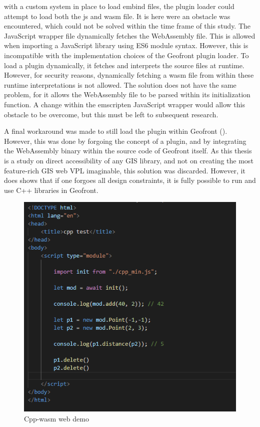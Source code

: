 with a custom system in place to load embind files, the plugin loader could attempt to load both the js and wasm file. 
It is here were an obstacle was encountered, which could not be solved within the time frame of this study. 
The JavaScript wrapper file dynamically fetches the WebAssembly file. 
This is allowed when importing a JavaScript library using ES6 module syntax. 
However, this is incompatible with the implementation choices of the Geofront plugin loader. 
To load a plugin dynamically, it fetches and interprets the source files at runtime. 
However, for security reasons, dynamically fetching a wasm file from within these runtime interpretations is not allowed.
The  solution does not have the same problem, for it allows the WebAssembly file to be parsed within its initialization function.
A change within the emscripten JavaScript wrapper would allow this obstacle to be overcome, but this must be left to subsequent research. 

A final workaround was made to still load the plugin within Geofront (). 
However, this was done by forgoing the concept of a plugin, and by integrating the WebAssembly binary within the source code of Geofront itself.
As this thesis is a study on direct accessibility of any \ac{GIS} library, and not on creating the most feature-rich \ac{GIS} web \ac{VPL} imaginable, this solution was discarded.    
However, it does shows that if one forgoes all design constraints, it is fully possible to run and use C++ libraries in Geofront. 

\begin{figure}
  \graphicspath{{../../assets/images/6.1.3}}
  \centering
  \includegraphics[width=0.50\linewidth]{demo.PNG}
  \caption[loading a plugin]{Cpp-wasm web demo}
  \label{fig:min-cpp-demo}
\end{figure}

